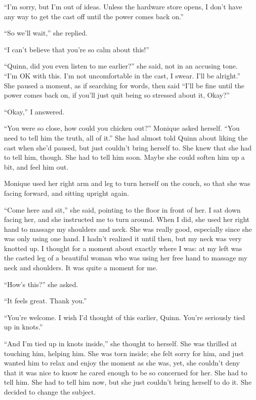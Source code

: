 ``I'm sorry, but I'm out of ideas. Unless the hardware store opens, I don't have any way
to get the cast off until the power comes back on.''

``So we'll wait,'' she replied.

``I can't believe that you're so calm about this!''

``Quinn, did you even listen to me earlier?'' she said, not in an accusing tone. ``I'm OK
with this. I'm not uncomfortable in the cast, I swear. I'll be alright.'' She paused a moment,
as if searching for words, then said ``I'll be fine until the power comes back on, if you'll
just quit being so stressed about it, Okay?''

``Okay,'' I answered.

\begin{thought}
``You were so close, how could you chicken out?'' Monique asked herself. ``You need to
tell him the truth, all of it.'' She had almost told Quinn about liking the cast when she'd
paused, but just couldn't bring herself to. She knew that she had to tell him, though. She had
to tell him soon. Maybe she could soften him up a bit, and feel him out.
\end{thought}

Monique used her right arm and leg to turn herself on the couch, so that she was facing
forward, and sitting upright again.

``Come here and sit,'' she said, pointing to the floor in front of her. I sat down facing
her, and she instructed me to turn around. When I did, she used her right hand to massage my
shoulders and neck. She was really good, especially since she was only using one hand. I hadn't
realized it until then, but my neck was very knotted up. I thought for a moment about exactly
where I was: at my left was the casted leg of a beautiful woman who was using her free hand to
massage my neck and shoulders. It was quite a moment for me.

``How's this?'' she asked.

``It feels great. Thank you.''

``You're welcome. I wish I'd thought of this earlier, Quinn. You're seriously tied up in
knots.''

\begin{thought}
``And I'm tied up in knots inside,'' she thought to herself. She was thrilled at touching
him, helping him. She was torn inside; she felt sorry for him, and just wanted him to relax and
enjoy the moment as she was, yet, she couldn't deny that it was nice to know he cared enough to
be so concerned for her. She had to tell him. She had to tell him now, but she just couldn't
bring herself to do it. She decided to change the subject.
\end{thought}

